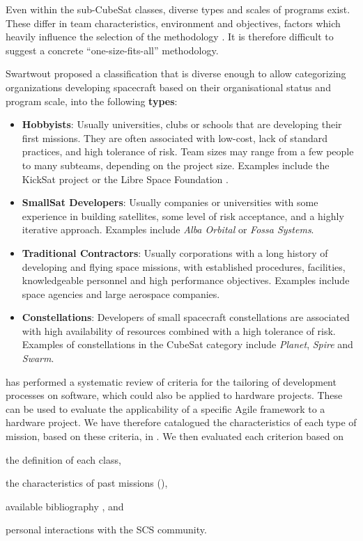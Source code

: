 \documentclass[journal,10pt]{IEEEtran}
\begin{document}
Even within the sub-CubeSat classes, diverse types and scales of programs exist. These differ in team characteristics, environment and objectives, factors which heavily influence the selection of the methodology \autocite{kalusCriteriaSoftwareProcess2013}. It is therefore difficult to suggest a concrete ``one-size-fits-all'' methodology.

Swartwout \autocite{swartwoutYouSayPicosat2018} proposed a classification that is diverse enough to allow categorizing organizations developing spacecraft based on their organisational status and program scale, into the following \textbf{types}:
\begin{itemize}
	\item \textbf{Hobbyists}: Usually universities, clubs or schools that are developing their first missions. They are often associated with low-cost, lack of standard practices, and high tolerance of risk. Team sizes may range from a few people to many subteams, depending on the project size. Examples include the KickSat project \autocite{manchesterCentimeterScaleSpacecraftDesign2015} or the Libre Space Foundation \autocite{triantafyllopoulouQUBIKProjectReady2020}.
	\item \textbf{SmallSat Developers}: Usually companies or universities with some experience in building satellites, some level of risk acceptance, and a highly iterative approach. Examples include \emph{Alba Orbital} or \emph{Fossa Systems}.
	\item \textbf{Traditional Contractors}: Usually corporations with a long history of developing and flying space missions, with established procedures, facilities, knowledgeable personnel and high performance objectives. Examples include space agencies and large aerospace companies.
	\item \textbf{Constellations}: Developers of small spacecraft constellations are associated with high availability of resources combined with a high tolerance of risk. Examples of constellations in the CubeSat category include \emph{Planet}, \emph{Spire} and \emph{Swarm}.
\end{itemize}


\citeauthor{kalusCriteriaSoftwareProcess2013} \autocite{kalusCriteriaSoftwareProcess2013} has performed a systematic review of criteria for the tailoring of development processes on software, which could also be applied to hardware projects. These can be used to evaluate the applicability of a specific Agile framework to a hardware project. We have therefore catalogued the characteristics of each type of mission, based on these criteria, in .
We then evaluated each criterion based on \begin{enumerate*}
    \item the definition of each class,
    \item the characteristics of past missions (),
    \item available bibliography \autocite{sweetingModernSmallSatellitesChanging2018,swartwoutYouSayPicosat2018,dillonFasterBetterCheaperProjectsToo2015}, and
    \item personal interactions with the \acs{SCS} community.
\end{enumerate*}
\end{document}
